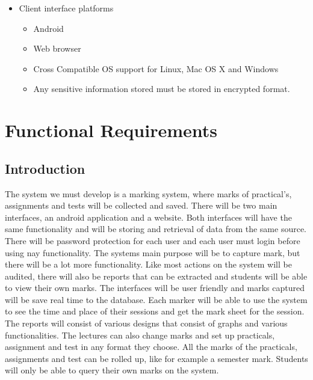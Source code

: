 \documentclass[10pt,a4paper]{article}
\begin{document}
                \begin{itemize}
                        \item Client interface platforms
                                                        \begin{itemize}
                                                                \item Android
                                                                \item Web browser
                                                                \item Cross Compatible OS support for Linux, Mac OS X and Windows
                                                                \item Any sensitive information stored must be stored in encrypted format.
                                                        \end{itemize}                                           
                \end{itemize}                                           
                
\section{Functional Requirements}
\subsection{Introduction}
The system we must develop is a marking system, where marks of practical’s, assignments and tests will be collected and saved. There will be two main interfaces, an android application and a website. Both interfaces will have the same functionality and will be storing and retrieval of data from the same source.\linebreak
There will be password protection for each user and each user must login before using nay functionality.\linebreak
The systems main purpose will be to capture mark, but there will be a lot more functionality. Like most actions on the system will be audited, there will also be reports that can be extracted and students will be able to view their own marks.\linebreak
The interfaces will be user friendly and marks captured will be save real time to the database. Each marker will be able to use the system to see the time and place of their sessions and get the mark sheet for the session.\linebreak 
The reports will consist of various designs that consist of graphs and various functionalities. The lectures can also change marks and set up practicals, assignment and test in any format they choose. All the marks of the practicals, assignments and test can be rolled up, like for example a semester mark. Students will only be able to query their own marks on the system. 
\end{document}
